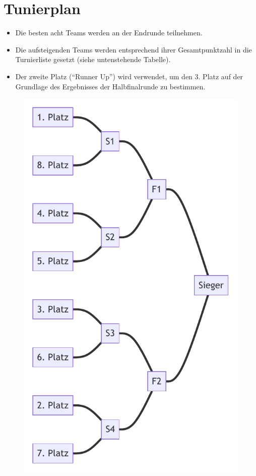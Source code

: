 \documentclass[a4paper,12pt]{article}
\begin{document}
\section{Tunierplan}
\begin{itemize}
        \item Die besten acht Teams werden an der Endrunde teilnehmen.
	\item Die aufsteigenden Teams werden entsprechend ihrer Gesamtpunktzahl
		in die Turnierliste gesetzt (siehe untenstehende Tabelle).
	\item Der zweite Platz ("`Runner Up"') wird verwendet, um den 3. Platz
		auf der Grundlage des Ergebnisses der Halbfinalrunde zu
		bestimmen.
\end{itemize}
\begin{figure}[H]
    \centering
    \def\svgwidth{\columnwidth}
    \includegraphics{tournament_score/tournament_score.pdf}
\end{figure}
\end{document}
